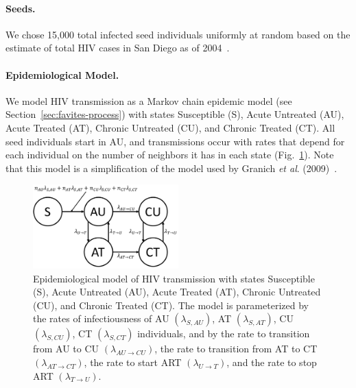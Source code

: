 \paragraph{Seeds.} We chose 15,000 total infected seed individuals uniformly at random based on the estimate of total \gls{HIV} cases in San Diego as of 2004~\cite{Macchione2015}.

\paragraph{Epidemiological Model.} We model \gls{HIV} transmission as a Markov chain epidemic model (see Section~\ref{sec:favites-process}) with states Susceptible (S), Acute Untreated (AU), Acute Treated (AT), Chronic Untreated (CU), and Chronic Treated (CT). All seed individuals start in AU, and transmissions occur with rates that depend for each individual on the number of neighbors it has in each state (Fig.~\ref{fig:favites-model}). Note that this model is a simplification of the model used by Granich \textit{et al}. (2009)~\cite{Granich2009}.

\begin{figure} %
\centering
\includegraphics[width=0.5\textwidth]{figs/favites-model}
\caption[Epidemiological Model]
{Epidemiological model of \gls{HIV} transmission with states Susceptible (S), Acute Untreated (AU), Acute Treated (AT), Chronic Untreated (CU), and Chronic Treated (CT). The model is parameterized by the rates of infectiousness of AU $(\lambda_{S,AU})$,  AT $(\lambda_{S,AT})$, CU $(\lambda_{S,CU})$, CT $(\lambda_{S,CT})$ individuals, and by the rate to transition from AU to CU $(\lambda_{AU \rightarrow CU})$, the rate to transition from AT to CT $(\lambda_{AT \rightarrow CT})$, the rate to start \gls{ART} $(\lambda_{U \rightarrow T})$, and the rate to stop ART $(\lambda_{T \rightarrow U})$.}
\label{fig:favites-model}
\end{figure}

